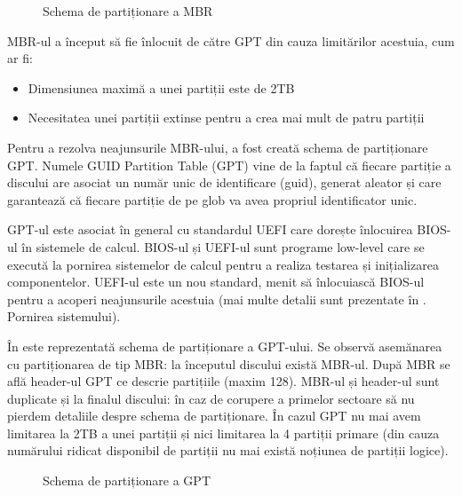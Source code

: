 \begin{figure}[htbp]
	\centering
	\def\svgwidth{\columnwidth}
	
	\caption{Schema de partiționare a MBR}
	\label{fig:storage-mbr-struct}
\end{figure}

MBR-ul a început să fie înlocuit de către GPT din cauza limitărilor acestuia,
cum ar fi:

\begin{itemize}
	\item Dimensiunea maximă a unei partiții este de 2TB
	\item Necesitatea unei partiții extinse pentru a crea mai mult de patru partiții
\end{itemize}

Pentru a rezolva neajunsurile MBR-ului, a fost creată schema de partiționare
GPT. Numele GUID Partition Table (GPT) vine de la faptul că fiecare partiție a
discului are asociat un număr unic de identificare (guid), generat aleator și
care garantează că fiecare partiție de pe glob va avea propriul identificator
unic.

GPT-ul este asociat în general cu standardul UEFI care dorește înlocuirea
BIOS-ul în sistemele de calcul. BIOS-ul și UEFI-ul sunt programe low-level care
se execută la pornirea sistemelor de calcul pentru a realiza testarea și
inițializarea componentelor. UEFI-ul este un nou standard, menit să înlocuiască
BIOS-ul pentru a acoperi neajunsurile acestuia (mai multe detalii sunt
prezentate în . Pornirea sistemului).

În  este reprezentată schema de
partiționare a GPT-ului. Se observă asemănarea cu partiționarea de tip MBR: la
începutul discului există MBR-ul. După MBR se află header-ul GPT ce descrie
partițiile (maxim 128). MBR-ul și header-ul sunt duplicate și la finalul
discului: în caz de corupere a primelor sectoare să nu pierdem detaliile despre
schema de partiționare. În cazul GPT nu mai avem limitarea la 2TB a unei
partiții și nici limitarea la 4 partiții primare (din cauza numărului ridicat
disponibil de partiții nu mai există noțiunea de partiții logice).

\begin{figure}[htbp]
	\centering
	\def\svgwidth{\columnwidth}
	
	\caption{Schema de partiționare a GPT}
	\label{fig:storage-gpt-struct}
\end{figure}

